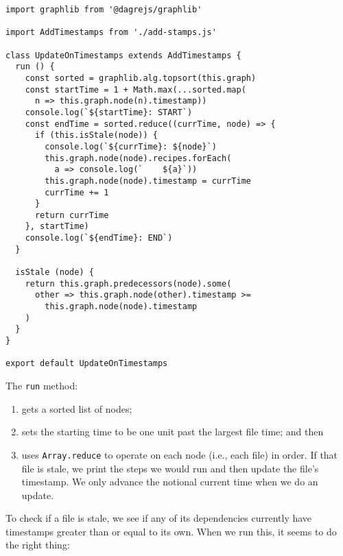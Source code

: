 \documentclass[krantzl]{krantz}
\begin{document}
\begin{lstlisting}[frame=tblr]
import graphlib from '@dagrejs/graphlib'

import AddTimestamps from './add-stamps.js'

class UpdateOnTimestamps extends AddTimestamps {
  run () {
    const sorted = graphlib.alg.topsort(this.graph)
    const startTime = 1 + Math.max(...sorted.map(
      n => this.graph.node(n).timestamp))
    console.log(`${startTime}: START`)
    const endTime = sorted.reduce((currTime, node) => {
      if (this.isStale(node)) {
        console.log(`${currTime}: ${node}`)
        this.graph.node(node).recipes.forEach(
          a => console.log(`    ${a}`))
        this.graph.node(node).timestamp = currTime
        currTime += 1
      }
      return currTime
    }, startTime)
    console.log(`${endTime}: END`)
  }

  isStale (node) {
    return this.graph.predecessors(node).some(
      other => this.graph.node(other).timestamp >=
        this.graph.node(node).timestamp
    )
  }
}

export default UpdateOnTimestamps
\end{lstlisting}



The \texttt{run} method:

\begin{enumerate}

\item 

gets a sorted list of nodes;



\item 

sets the starting time to be one unit past the largest file time;
    and then



\item 

uses \texttt{Array.reduce} to operate on each node (i.e., each file) in order.
    If that file is stale,
    we print the steps we would run and then update the file’s timestamp.
    We only advance the notional current time when we do an update.



\end{enumerate}


\noindent To check if a file is stale,
we see if any of its dependencies currently have timestamps greater than or equal to its own.
When we run this,
it seems to do the right thing:
\end{document}
